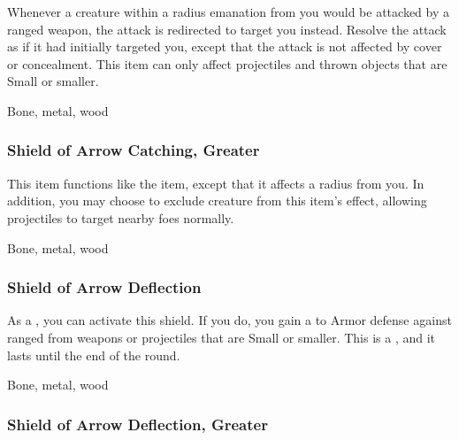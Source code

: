 Whenever a creature within a \areamed radius emanation from you would be attacked by a ranged weapon, the attack is redirected to target you instead.
Resolve the attack as if it had initially targeted you, except that the attack is not affected by cover or concealment.
This item can only affect projectiles and thrown objects that are Small or smaller.



 


 Bone, metal, wood


\lowercase{\hypertarget{item:Shield of Arrow Catching, Greater}{}}\label{item:Shield of Arrow Catching, Greater}
\hypertarget{item:Shield of Arrow Catching, Greater}{\subsubsection{Shield of Arrow Catching, Greater\hfill{}}}

This item functions like the  item, except that it affects a \arealarge radius from you.
In addition, you may choose to exclude creature from this item's effect, allowing projectiles to target nearby foes normally.



 


 Bone, metal, wood


\lowercase{\hypertarget{item:Shield of Arrow Deflection}{}}\label{item:Shield of Arrow Deflection}
\hypertarget{item:Shield of Arrow Deflection}{\subsubsection{Shield of Arrow Deflection\hfill{}}}

As a , you can activate this shield.
If you do, you gain a   to Armor defense against ranged  from weapons or projectiles that are Small or smaller.
This is a , and it lasts until the end of the round.



 


 Bone, metal, wood


\lowercase{\hypertarget{item:Shield of Arrow Deflection, Greater}{}}\label{item:Shield of Arrow Deflection, Greater}
\hypertarget{item:Shield of Arrow Deflection, Greater}{\subsubsection{Shield of Arrow Deflection, Greater\hfill{}}}

